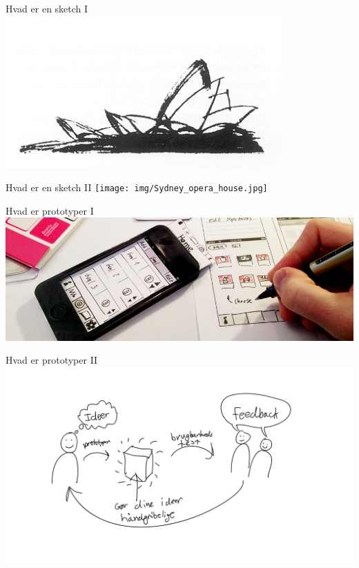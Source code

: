 \documentclass[10pt]{beamer}
\begin{document}
\begin{frame}{Hvad er en sketch I}
	\centering
	\includegraphics[width=\linewidth]{img/operasketch.jpg}
\end{frame}

\begin{frame}{Hvad er en sketch II}
	\centering
	\texttt{[image: img/Sydney\_opera\_house.jpg]}
\end{frame}

\begin{frame}{Hvad er prototyper I}
	\centering
	\includegraphics[width=\linewidth]{img/paperprotoyping.jpg}
\end{frame}

\begin{frame}{Hvad er prototyper II}
	\centering
	\includegraphics[scale=0.18]{img/prototypingloop.pdf}
\end{frame}
\end{document}
